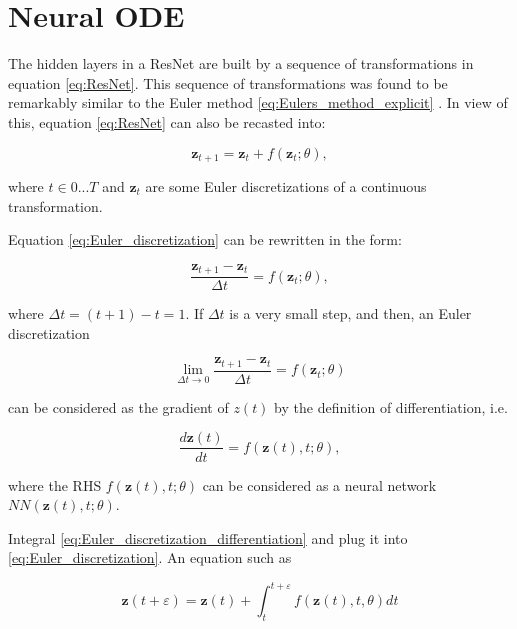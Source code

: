 \documentclass[
	parskip, 			   %
	twoside, 			   %
	DIV=14, 			   %
	BCOR=15.0mm, 		   %
	headsepline, 		   %
	open=right, 		   %
	captions=tableheading, %
	bibliography=totoc,    %
	numbers=noenddot       %
]{scrreprt}
\begin{document}
\section{Neural ODE}
The hidden layers in a ResNet are built by a sequence of transformations in equation \ref{eq:ResNet}. This sequence of transformations was found to be remarkably similar to the Euler method \ref{eq:Eulers_method_explicit} \cite{ruthotto2020deep}. In view of this, equation \ref{eq:ResNet} can also be recasted into:

\begin{equation}
    \label{eq:Euler_discretization}
    \mathbf{z}_{t+1} = \mathbf{z}_{t} + f(\mathbf{z}_{t}; \theta),
\end{equation}

where $t \in {0 ... T}$ and $\mathbf{z}_{t}$ are some Euler discretizations of a continuous transformation.

Equation \ref{eq:Euler_discretization} can be rewritten in the form:

\begin{equation}
    \label{eq:Euler_discretization_rewritten}
    \frac{\mathbf{z}_{t+1}-\mathbf{z}_{t}}{\Delta t} = f(\mathbf{z}_{t}; \theta),
\end{equation}

where $\Delta t = (t+1)-t = 1$. If $\Delta t$ is a very small step, and then, an Euler discretization

\begin{equation}
    \label{eq:Euler_discretization_small_step}
    \lim_{\Delta t \to 0} \frac{\mathbf{z}_{t+1}-\mathbf{z}_{t}}{\Delta t} = f(\mathbf{z}_{t}; \theta)
\end{equation}

can be considered as the gradient of $z(t)$ by the definition of differentiation, i.e.

\begin{equation}
    \label{eq:Euler_discretization_differentiation}
    \frac{d\mathbf{z}(t)}{dt} = f(\mathbf{z}(t), t; \theta),
\end{equation}

where the RHS $f(\mathbf{z}(t), t; \theta)$ can be considered as a neural network $NN(\mathbf{z}(t), t; \theta)$.

Integral \ref{eq:Euler_discretization_differentiation} and plug it into \ref{eq:Euler_discretization}. An equation such as 

\begin{equation}
    \label{eq:Neural_ODE}
    \mathbf{z}(t+\varepsilon ) = \mathbf{z}(t) + \int_{t}^{t+\varepsilon } f(\mathbf{z}(t), t, \theta)dt
\end{equation}
\end{document}
